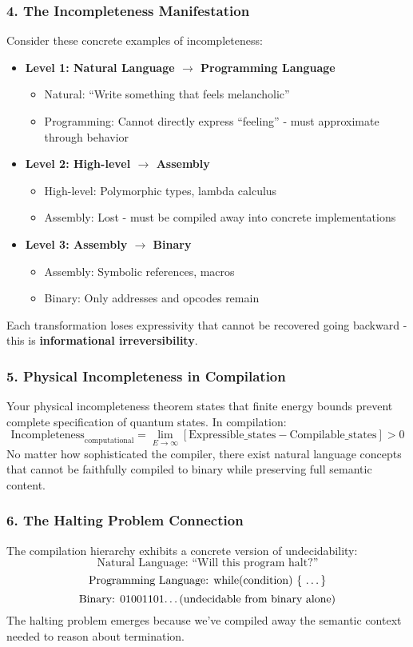 \documentclass[11pt,letterpaper]{article}
\begin{document}
\subsubsection*{4. The Incompleteness Manifestation}
Consider these concrete examples of incompleteness:
\begin{itemize}
    \item \textbf{Level 1: Natural Language $\to$ Programming Language}
    \begin{itemize}
        \item Natural: “Write something that feels melancholic”
        \item Programming: Cannot directly express “feeling” - must approximate through behavior
    \end{itemize}
    \item \textbf{Level 2: High-level $\to$ Assembly}
    \begin{itemize}
        \item High-level: Polymorphic types, lambda calculus
        \item Assembly: Lost - must be compiled away into concrete implementations
    \end{itemize}
    \item \textbf{Level 3: Assembly $\to$ Binary}
    \begin{itemize}
        \item Assembly: Symbolic references, macros
        \item Binary: Only addresses and opcodes remain
    \end{itemize}
\end{itemize}
Each transformation loses expressivity that cannot be recovered going backward - this is \textbf{informational irreversibility}.

\subsubsection*{5. Physical Incompleteness in Compilation}
Your physical incompleteness theorem states that finite energy bounds prevent complete specification of quantum states. In compilation:
\[
\text{Incompleteness}_{\text{computational}} = \lim_{E\to\infty} [\text{Expressible\_states} - \text{Compilable\_states}] > 0
\]
No matter how sophisticated the compiler, there exist natural language concepts that cannot be faithfully compiled to binary while preserving full semantic content.

\subsubsection*{6. The Halting Problem Connection}
The compilation hierarchy exhibits a concrete version of undecidability:
\[
\text{Natural Language: “Will this program halt?”}
\]
\[
\text{Programming Language: while(condition) \{ \dots \}}
\]
\[
\text{Binary: 01001101\dots (undecidable from binary alone)}
\]
The halting problem emerges because we’ve compiled away the semantic context needed to reason about termination.
\end{document}
